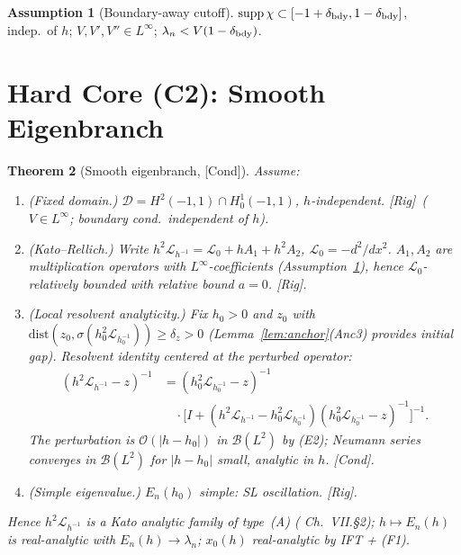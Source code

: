 \documentclass[12pt,a4paper]{amsart}
\newtheorem{theorem}{Theorem}[section]
\theoremstyle{definition}
\newtheorem{assumption}[theorem]{Assumption}
\theoremstyle{remark}
\newcommand{\Rig}{\textup{[Rig]}}
\newcommand{\Cond}{\textup{[Cond]}}
\begin{document}
\begin{assumption}[Boundary-away cutoff]
\label{ass:boundary-away}
$\mathrm{supp}\,\chi\subset[-1+\delta_{\rm bdy},1-\delta_{\rm bdy}]$,
indep.\ of $h$; $V,V',V''\in L^\infty$;
$\lambda_n<V(1-\delta_{\rm bdy})$.
\end{assumption}

\section{Hard Core (C2): Smooth Eigenbranch}
\label{sec:eigenbranch}

\begin{theorem}[Smooth eigenbranch, \Cond]
\label{thm:eigenbranch}
Assume:
\begin{enumerate}[{\rm(E1)}]
\item \textit{(Fixed domain.)} $\mathcal{D}=H^2(-1,1)\cap H^1_0(-1,1)$,
  $h$-independent. \Rig\ ($V\in L^\infty$; boundary cond.\ independent of $h$).
\item \textit{(Kato--Rellich.)}
  Write $h^2\mathcal{L}_{h^{-1}}=\mathcal{L}_0+hA_1+h^2A_2$,
  $\mathcal{L}_0=-d^2/dx^2$.
  $A_1,A_2$ are multiplication operators with $L^\infty$-coefficients
  (Assumption~\ref{ass:boundary-away}),
  hence $\mathcal{L}_0$-relatively bounded with relative bound $a=0$. \Rig.
\item \textit{(Local resolvent analyticity.)}
  Fix $h_0>0$ and $z_0$ with
  $\mathrm{dist}(z_0,\sigma(h_0^2\mathcal{L}_{h_0^{-1}}))\ge\delta_z>0$
  (Lemma~\ref{lem:anchor}(Anc3) provides initial gap).
  Resolvent identity centered at the \emph{perturbed} operator:
  \begin{align*}
    (h^2\mathcal{L}_{h^{-1}}-z)^{-1}
    &= (h_0^2\mathcal{L}_{h_0^{-1}}-z)^{-1}\\
    &\quad\cdot\bigl[I+(h^2\mathcal{L}_{h^{-1}}-h_0^2\mathcal{L}_{h_0^{-1}})
      (h_0^2\mathcal{L}_{h_0^{-1}}-z)^{-1}\bigr]^{-1}.
  \end{align*}
  The perturbation is $\mathcal{O}(|h-h_0|)$ in $\mathcal{B}(L^2)$ by (E2);
  Neumann series converges in $\mathcal{B}(L^2)$ for $|h-h_0|$ small,
  analytic in $h$. \Cond.
\item \textit{(Simple eigenvalue.)} $E_n(h_0)$ simple: SL oscillation. \Rig.
\end{enumerate}
Hence $h^2\mathcal{L}_{h^{-1}}$ is a Kato analytic family of type~(A)
(\cite{Kato1966} Ch.~VII.\S2);
$h\mapsto E_n(h)$ is real-analytic with $E_n(h)\to\lambda_n$;
$x_0(h)$ real-analytic by IFT + (F1).
\end{theorem}
\end{document}
